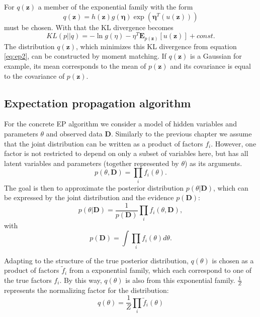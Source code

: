 \documentclass{sigkdd}
\begin{document}
For $q(\mathbf{z})$ a member of the exponential family with the form
\begin{equation}\label{eq:ep1}
q(\mathbf{z}) = h(\mathbf{z})g(\mathbf{\eta}) \exp(\mathbf{\eta}^T(u(\mathbf{z})))
\end{equation}
must be chosen. With that the KL divergence becomes
\begin{equation}\label{eq:ep2}
KL(p||q)= - \ln g(\eta) - \eta^T \mathbf{E}_{p(\mathbf{z})} [u(\mathbf{z})] + const.
\end{equation}
The distribution $q(\mathbf{z})$, which minimizes this KL divergence from equation \ref{eq:ep2}, can be constructed by moment matching. If $q(\mathbf{z})$ is a Gaussian for example, its mean corresponds to the mean of $p(\mathbf{z})$ and its covariance is equal to the covariance of $p(\mathbf{z})$.

\subsection{Expectation propagation algorithm}
For the concrete EP algorithm we consider a model of hidden variables and parameters $\theta$ and observed data $\mathbf{D}$. Similarly to the previous chapter we assume that the joint distribution can be written as a product of factors $f_i$. However, one factor is not restricted to depend on only a subset of variables here, but has all latent variables and parameters (together represented by $\theta$) as its arguments.
\begin{equation}\label{eq:ep3}
p(\theta, \mathbf{D}) = \prod_i f_i(\theta).
\end{equation}
The goal is then to approximate the posterior distribution $p(\theta|\mathbf{D})$, which can be expressed by the joint distribution and the evidence $p(\mathbf{D})$:
\begin{equation}\label{eq:ep4}
p(\theta|\mathbf{D}) = \frac{1}{p(\mathbf{D})} \prod_i f_i(\theta , \mathbf{D}),
\end{equation}
with 
\begin{equation}\label{eq:ep5}
p(\mathbf{D}) = \int \prod_i f_i(\theta) d\theta.
\end{equation}  

Adapting to the structure of the true posterior distribution, $q(\theta)$ is chosen as a product of factors $\tilde{f}_i$ from a exponential family, which each correspond to one of the true factors $f_i$. By this way, $q(\theta)$ is also from this exponential family. $\frac{1}{Z}$ represents the normalizing factor for the distribution:
\begin{equation}\label{eq:ep6}
q(\theta) = \frac{1}{Z}\prod_i \tilde{f}_i(\theta)
\end{equation}
\end{document}

